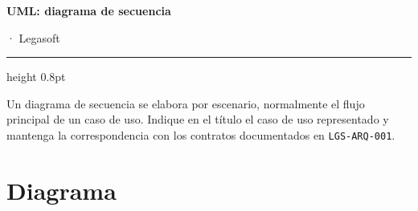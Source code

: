 \documentclass[11pt,a4paper]{article}
\begin{document}
\begin{center}
{\sffamily\bfseries\LARGE\color{lgPrimario} UML: diagrama de secuencia\par}
\vspace{2pt}
{\sffamily\normalsize\color{lgGris}  · Legasoft\par}
\end{center}
\vspace{6pt}
{\color{lgBorde}\hrule height 0.8pt}
\vspace{10pt}

\begin{porcompletar}
Un diagrama de secuencia se elabora por escenario, normalmente el flujo principal
de un caso de uso. Indique en el título el caso de uso representado y mantenga la
correspondencia con los contratos documentados en \texttt{LGS-ARQ-001}.
\end{porcompletar}

\section*{Diagrama}
\end{document}
